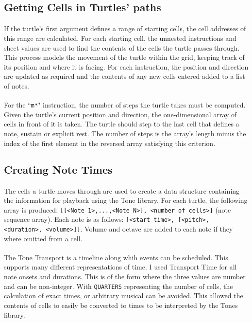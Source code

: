 \subsection{Getting Cells in Turtles' paths}

\paragraph{} If the turtle's first argument defines a range of starting cells, the cell addresses of this range are calculated. For each starting cell, the unnested instructions and sheet values are used to find the contents of the cells the turtle passes through. This process models the movement of the turtle within the grid, keeping track of its position and where it is facing. For each instruction, the position and direction are updated as required and the contents of any new cells entered added to a list of notes.

\paragraph{} For the ``\texttt{m*}" instruction, the number of steps the turtle takes must be computed. Given the turtle's current position and direction, the one-dimensional array of cells in front of it is taken. The turtle should step to the last cell that defines a note, sustain or explicit rest. The number of steps is the array's length minus the index of the first element in the reversed array satisfying this criterion.

\subsection{Creating Note Times}

\paragraph{} The cells a turtle moves through are used to create a data structure containing the information for playback using the Tone library. For each turtle, the following array is produced: \texttt{[[<Note 1>,...,<Note N>], <number of cells>]} (note sequence array). Each note is as follows: \texttt{[<start time>, [<pitch>, <duration>, <volume>]]}. Volume and octave are added to each note if they where omitted from a cell.

\paragraph{} The Tone Transport is a timeline along whih events can be scheduled. This supports many different representations of time. I used Transport Time for all note onsets and durations. This is of the form \texttt{} where the three values are number and can be non-integer. With \texttt{QUARTERS} representing the number of cells, the calculation of exact times, or arbitrary musical can be avoided. This allowed the contents of cells to easily be converted to times to be interpreted by the Tones library.

